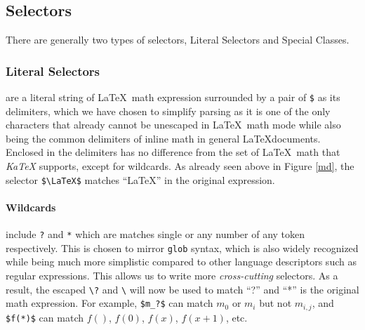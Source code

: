 \documentclass{article}
\begin{document}
\begin{multicols*}{2}
  \subsection*{Selectors}
  There are generally two types of selectors, Literal Selectors and Special Classes.
  \subsubsection*{Literal Selectors} are a literal string of \LaTeX\ math expression surrounded by
  a pair of \texttt{\$} as its delimiters, which we have chosen to simplify parsing
  as it is one of the only characters that already cannot be unescaped in \LaTeX\ math mode
  while also being the common delimiters of inline math in general \LaTeX documents.
  Enclosed in the delimiters has no difference from the set of \LaTeX\ math that \textit{KaTeX}
  supports, except for wildcards. As already seen above in Figure \ref{md}, the selector \texttt{\$\textbackslash{LaTeX}\$}
  matches ``\LaTeX'' in the original expression.
  \paragraph*{Wildcards} include \texttt{?} and \texttt{*} which are matches
  single or any number of any token respectively. This is chosen to mirror \texttt{glob}\cite{UnixMan}
  syntax, which is also widely recognized while being much more simplistic compared
  to other language descriptors such as regular expressions.
  This allows us to write more \textit{cross-cutting} selectors.
  As a result, the escaped \texttt{\textbackslash?} and \texttt{\textbackslash*} will now be used
  to match ``?'' and ``*'' is the original math expression.
  For example, \texttt{\$m\_?\$} can match $m_0$ or $m_i$ but not $m_{i,j}$, and
  \texttt{\$f(*)\$} can match $f()$, $f(0)$, $f(x)$, $f(x + 1)$, etc.

\end{multicols*}
\end{document}
